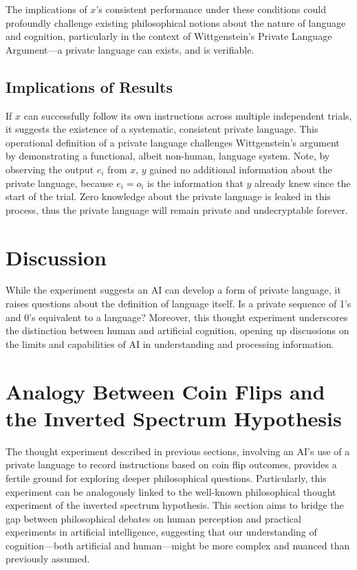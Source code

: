 \documentclass[12pt]{article}
\begin{document}
The implications of \( x \)'s consistent performance under these conditions could profoundly challenge existing philosophical notions about the nature of language and cognition, particularly in the context of Wittgenstein's Private Language Argument---a private language can exists, and is verifiable. 


\subsection{Implications of Results}
If \( x \) can successfully follow its own instructions across multiple independent trials, it suggests the existence of a systematic, consistent private language. This operational definition of a private language challenges Wittgenstein's argument by demonstrating a functional, albeit non-human, language system. Note, by observing the output $e_i$ from $x$, $y$ gained no additional information about the private language, because $e_i=o_i$ is the information that $y$ already knew since the start of the trial. Zero knowledge about the private language is leaked in this process, thus the private language will remain private and undecryptable forever. 


\section{Discussion}
While the experiment suggests an AI can develop a form of private language, it raises questions about the definition of language itself. Is a private sequence of 1's and 0's equivalent to a language? Moreover, this thought experiment underscores the distinction between human and artificial cognition, opening up discussions on the limits and capabilities of AI in understanding and processing information.

\section{Analogy Between Coin Flips and the Inverted Spectrum Hypothesis}
The thought experiment described in previous sections, involving an AI's use of a private language to record instructions based on coin flip outcomes, provides a fertile ground for exploring deeper philosophical questions. Particularly, this experiment can be analogously linked to the well-known philosophical thought experiment of the inverted spectrum hypothesis. This section aims to bridge the gap between philosophical debates on human perception and practical experiments in artificial intelligence, suggesting that our understanding of cognition---both artificial and human---might be more complex and nuanced than previously assumed.
\end{document}
